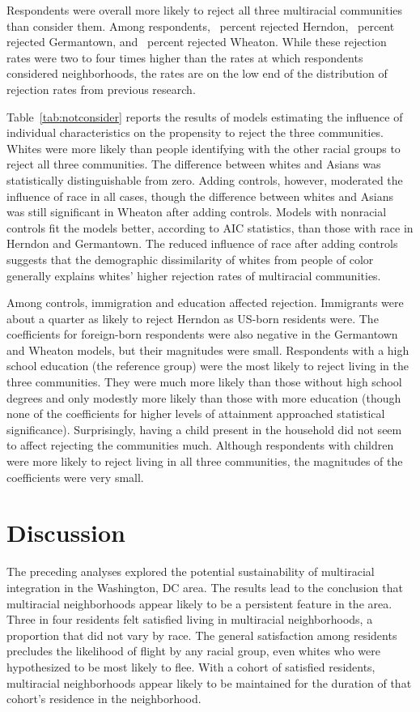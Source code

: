\documentclass{baderart}
\begin{document}
Respondents were overall more likely to reject all three multiracial communities than consider them. Among respondents, \ncherndon~percent rejected Herndon, \ncgermantown~percent rejected Germantown, and \ncwheaton~percent rejected Wheaton. While these rejection rates were two to four times higher than the rates at which respondents considered neighborhoods, the rates are on the low end of the distribution of rejection rates from previous research. 

Table~\ref{tab:notconsider} reports the results of models estimating the influence of individual characteristics on the propensity to reject the three communities. Whites were more likely than people identifying with the other racial groups to reject all three communities. The difference between whites and Asians was statistically distinguishable from zero. Adding controls, however, moderated the influence of race in all cases, though the difference between whites and Asians was still significant in Wheaton after adding controls. Models with nonracial controls fit the models better, according to AIC statistics, than those with race in Herndon and Germantown. The reduced influence of race after adding controls suggests that the demographic dissimilarity of whites from people of color generally explains whites' higher rejection rates of multiracial communities. 


Among controls, immigration and education affected rejection. Immigrants were about a quarter as likely to reject Herndon as US-born residents were. The coefficients for foreign-born respondents were also negative in the Germantown and Wheaton models, but their magnitudes were small. Respondents with a high school education (the reference group) were the most likely to reject living in the three communities. They were much more likely than those without high school degrees and only modestly more likely than those with more education (though none of the coefficients for higher levels of attainment approached statistical significance). Surprisingly, having a child present in the household did not seem to affect rejecting the communities much. Although respondents with children were more likely to reject living in all three communities, the magnitudes of the coefficients were very small.  

\section{Discussion}
The preceding analyses explored the potential sustainability of multiracial integration in the Washington, DC area. The results lead to the conclusion that multiracial neighborhoods appear likely to be a persistent feature in the area. Three in four residents felt satisfied living in multiracial neighborhoods, a proportion that did not vary by race. The general satisfaction among residents precludes the likelihood of flight by any racial group, even whites who were hypothesized to be most likely to flee. With a cohort of satisfied residents, multiracial neighborhoods appear likely to be maintained for the duration of that cohort's residence in the neighborhood.
\end{document}
